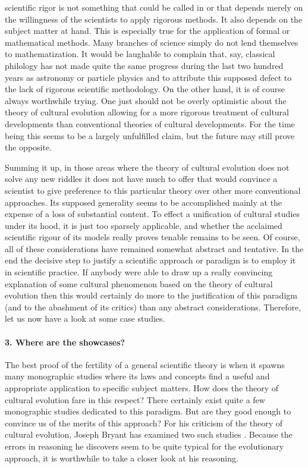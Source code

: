 scientific rigor is not something that could be called in or that depends
merely on the willingness of the scientists to apply rigorous methods. It also
depends on the subject matter at hand. This is especially true for the
application of formal or mathematical methods. Many branches of science simply
do not lend themselves to mathematization. It would be laughable to complain
that, say, classical philology has not made quite the same progress during the
last two hundred years as astronomy or particle physics and to attribute this
supposed defect to the lack of rigorous scientific methodology. On the other
hand, it is of course always worthwhile trying. One just should not be overly
optimistic about the theory of cultural evolution allowing for a more rigorous
treatment of cultural developments than conventional theories of cultural
developments.  For the time being this seems to be a largely unfulfilled
claim, but the future may still prove the opposite.

Summing it up, in those areas where the theory of cultural evolution does not
solve any new riddles it does not have much to offer that would convince a
scientist to give preference to this particular theory over other more
conventional approaches. Its supposed generality seems to be accomplished
mainly at the expense of a loss of substantial content. To effect a
unification of cultural studies under its hood, it is just too sparsely
applicable, and whether the acclaimed scientific rigour of its models really
proves tenable remains to be seen. Of course, all of these considerations have
remained somewhat abstract and tentative. In the end the decisive step to
justify a scientific approach or paradigm is to employ it in scientific
practice. If anybody were able to draw up a really convincing explanation of
some cultural phenomenon based on the theory of cultural evolution then this
would certainly do more to the justification of this paradigm (and to the
abashment of its critics) than any abstract considerations. Therefore, let us
now have a look at some case studies.


\paragraph{3. Where are the showcases?}

The best proof of the fertility of a general scientific theory is when it
spawns many monographic studies where its laws and concepts find a useful and
appropriate application to specific subject matters. How does the theory of
cultural evolution fare in this respect? There certainly exist quite a few
monographic studies dedicated to this paradigm. But are they good enough to
convince us of the merits of this approach? For his criticism of the theory of
cultural evolution, Joseph Bryant has examined two such studies
\cite[]{bryant:2004}. Because the errors in reasoning he discovers seem to be
quite typical for the evolutionary approach, it is worthwhile to take a closer
look at his reasoning.

